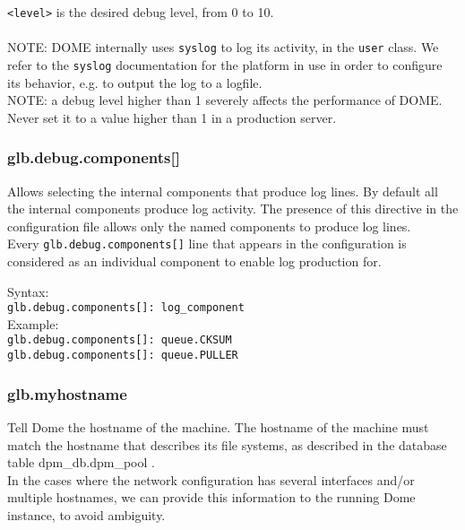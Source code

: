 \documentclass[a4paper,10pt]{scrreprt}
\begin{document}
\lstinline"<level>" is the desired debug level, from 0 to 10.\\ \\
 NOTE: DOME internally uses \lstinline"syslog" to log its activity, in the \lstinline"user" class. We refer to the \lstinline"syslog" documentation for the platform in use in order to configure its behavior, e.g. to output the log to a logfile.\\

 NOTE: a debug level higher than 1 severely affects the performance of DOME. Never set it to a value higher than 1 in a production server.\\

\subsubsection{glb.debug.components[]}

 Allows selecting the internal components that produce log lines. By default all the internal components produce log activity. The presence of this directive in the configuration file allows only the named components to produce log lines.\\

 Every \lstinline"glb.debug.components[]" line that appears in the configuration is considered as an individual component to enable log production for.

 Syntax:\\

\lstinline"glb.debug.components[]: log_component"\\

 Example:\\
\lstinline"glb.debug.components[]: queue.CKSUM"\\
\lstinline"glb.debug.components[]: queue.PULLER"\\

\subsubsection{glb.myhostname}
Tell Dome the hostname of the machine. The hostname of the machine must match the hostname that describes its file systems, as described in the database table dpm\_db.dpm\_pool .\\
In the cases where the network configuration has several interfaces and/or multiple hostnames, we can provide this information to the running Dome instance, to avoid ambiguity.\\
\end{document}
